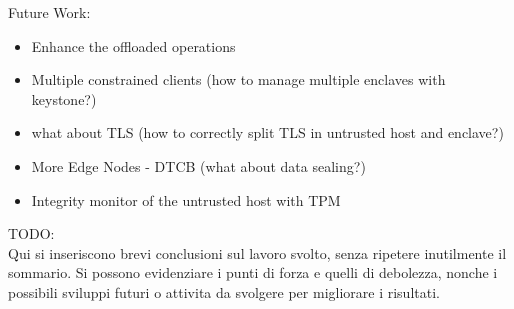 


\color{red}
Future Work:
\begin{itemize}
    \item Enhance the offloaded operations
    \item Multiple constrained clients (how to manage multiple enclaves with keystone?)
    \item what about TLS (how to correctly split TLS in untrusted host and enclave?)
    \item More Edge Nodes - DTCB (what about data sealing?)
    \item Integrity monitor of the untrusted host with TPM 
\end{itemize}
TODO: \\
Qui si inseriscono brevi conclusioni sul lavoro svolto, senza ripetere inutilmente il sommario.
Si possono evidenziare i punti di forza e quelli di debolezza, nonche i possibili sviluppi futuri o attivita da svolgere per migliorare i risultati.

\color{black}
